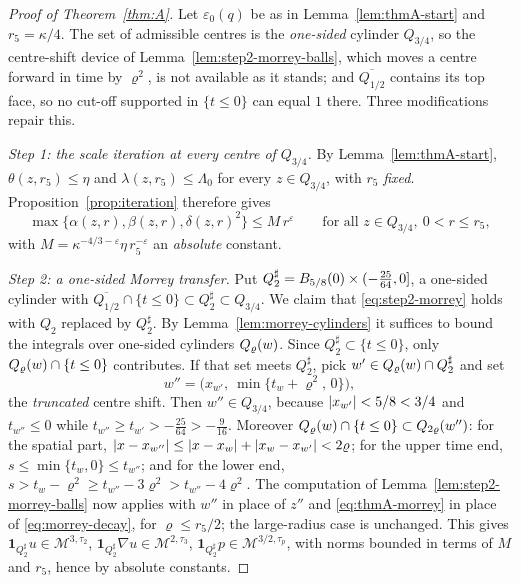 \documentclass[11pt,reqno]{amsart}
\begin{document}
\begin{proof}[Proof of Theorem~\ref{thm:A}]
Let $\varepsilon_{0}(q)$ be as in Lemma~\ref{lem:thmA-start} and
$r_{5}=\kappa/4$. The set of admissible centres is the \emph{one-sided}
cylinder $Q_{3/4}$, so the centre-shift device of
Lemma~\ref{lem:step2-morrey-balls}, which moves a centre forward in time by
$\varrho^{2}$, is not available as it stands; and $\overline{Q_{1/2}}$ contains
its top face, so no cut-off supported in $\{t\le0\}$ can equal $1$ there. Three
modifications repair this.

\emph{Step 1: the scale iteration at every centre of $Q_{3/4}$.} By
Lemma~\ref{lem:thmA-start}, $\theta(z,r_{5})\le\eta$ and
$\lambda(z,r_{5})\le\Lambda_{0}$ for every $z\in Q_{3/4}$, with $r_{5}$
\emph{fixed}. Proposition~\ref{prop:iteration} therefore gives
\begin{equation}\label{eq:thmA-morrey}
  \max\bigl\{\alpha(z,r),\beta(z,r),\delta(z,r)^{2}\bigr\}\le M\,r^{\varepsilon}
  \qquad\text{for all }z\in Q_{3/4},\ 0<r\le r_{5},
\end{equation}
with $M=\kappa^{-4/3-\varepsilon}\eta\,r_{5}^{-\varepsilon}$ an \emph{absolute}
constant.

\emph{Step 2: a one-sided Morrey transfer.} Put
$Q_{2}^{\sharp}=B_{5/8}(0)\times(-\tfrac{25}{64},0]$, a one-sided cylinder
with $\overline{Q_{1/2}}\cap\{t\le0\}\subset Q_{2}^{\sharp}\subset Q_{3/4}$. We
claim that \eqref{eq:step2-morrey} holds with $Q_{2}$ replaced by
$Q_{2}^{\sharp}$. By Lemma~\ref{lem:morrey-cylinders} it suffices to bound the
integrals over one-sided cylinders $Q_{\varrho}(w)$. Since
$Q_{2}^{\sharp}\subset\{t\le0\}$, only $Q_{\varrho}(w)\cap\{t\le0\}$
contributes. If that set meets $Q_{2}^{\sharp}$, pick
$w'\in Q_{\varrho}(w)\cap Q_{2}^{\sharp}$ and set
\[
  w''=\bigl(x_{w'},\ \min\{t_{w}+\varrho^{2},\,0\}\bigr),
\]
the \emph{truncated} centre shift. Then $w''\in Q_{3/4}$, because
$\left\lvert x_{w'} \right\rvert<5/8<3/4$ and $t_{w''}\le0$ while
$t_{w''}\ge t_{w'}>-\tfrac{25}{64}>-\tfrac9{16}$. Moreover
$Q_{\varrho}(w)\cap\{t\le0\}\subset Q_{2\varrho}(w'')$: for the spatial part,
$\left\lvert x-x_{w''} \right\rvert\le\left\lvert x-x_{w} \right\rvert+\left\lvert x_{w}-x_{w'} \right\rvert<2\varrho$; for the upper
time end, $s\le\min\{t_{w},0\}\le t_{w''}$; and for the lower end,
$s>t_{w}-\varrho^{2}\ge t_{w''}-3\varrho^{2}>t_{w''}-4\varrho^{2}$. The
computation of Lemma~\ref{lem:step2-morrey-balls} now applies with $w''$ in
place of $z''$ and \eqref{eq:thmA-morrey} in place of
\eqref{eq:morrey-decay}, for $\varrho\le r_{5}/2$; the large-radius case is
unchanged. This gives
$\mathbf{1}_{Q_{2}^{\sharp}}u\in\mathcal{M}^{3,\tau_{2}}$,
$\mathbf{1}_{Q_{2}^{\sharp}}\nabla u\in\mathcal{M}^{2,\tau_{3}}$,
$\mathbf{1}_{Q_{2}^{\sharp}}p\in\mathcal{M}^{3/2,\tau_{p}}$, with norms bounded
in terms of $M$ and $r_{5}$, hence by absolute constants.


\end{proof}
\end{document}
